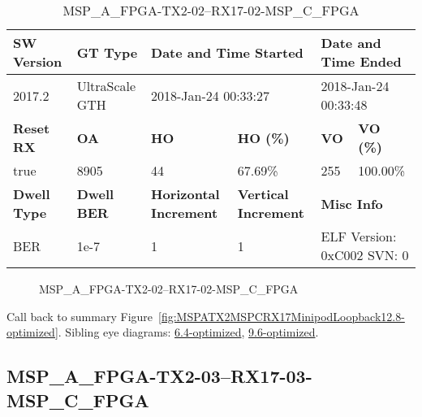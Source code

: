 \begin{table}[h]
\centering
\caption{MSP\_A\_FPGA-TX2-02--RX17-02-MSP\_C\_FPGA}
\label{tab:MSPAFPGATX202RX1702MSPCFPGA12.8-optimized}
\begin{tabular}{@{}|l|l|l|l|l|l|@{}}
\toprule
\textbf{SW Version}                & \textbf{GT Type}   & \multicolumn{2}{l|}{\textbf{Date and Time Started}}            & \multicolumn{2}{l|}{\textbf{Date and Time Ended}}        \\ \midrule
2017.2                       & UltraScale GTH          & \multicolumn{2}{l|}{2018-Jan-24 00:33:27}                   & \multicolumn{2}{l|}{2018-Jan-24 00:33:48}               \\ \midrule
\textbf{Reset RX}                  & \textbf{OA} & \textbf{HO}   & \textbf{HO (\%)} & \textbf{VO} & \textbf{VO (\%)} \\ \midrule
true & 8905        & 44          & 67.69\%        & 255        & 100.00\%       \\ \midrule
\textbf{Dwell Type}                & \textbf{Dwell BER} & \textbf{Horizontal Increment} & \textbf{Vertical Increment}    & \multicolumn{2}{l|}{\textbf{Misc Info}}                  \\ \midrule
BER                            & 1e-7        & 1        & 1           & \multicolumn{2}{l|}{ELF Version: 0xC002 SVN: 0}                         \\ \bottomrule
\end{tabular}
\end{table}

\begin{figure}[h]
\caption{MSP\_A\_FPGA-TX2-02--RX17-02-MSP\_C\_FPGA} \label{fig:MSPAFPGATX202RX1702MSPCFPGA12.8-optimized}
\end{figure}

Call back to summary Figure~\ref{fig:MSPATX2MSPCRX17MinipodLoopback12.8-optimized}.
Sibling eye diagrams: \hyperref[sec:MSPAFPGATX202RX1702MSPCFPGA6.4-optimized]{6.4-optimized}, \hyperref[sec:MSPAFPGATX202RX1702MSPCFPGA9.6-optimized]{9.6-optimized}.

\clearpage
\newpage


\subsection{MSP\_A\_FPGA-TX2-03--RX17-03-MSP\_C\_FPGA}\label{sec:MSPAFPGATX203RX1703MSPCFPGA12.8-optimized}

